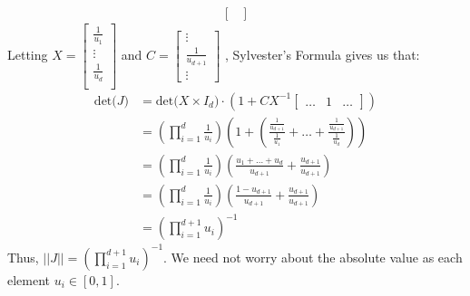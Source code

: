 \documentclass[paper=a4, fontsize=11pt]{scrartcl}
\newcommand{\parens}[1]{ \left( #1 \right) }
\begin{document}
\begin{enumerate}[1.]
\begin{enumerate}[1.]
\begin{align*}
\begin{bmatrix}
              \end{bmatrix}
        \end{align*}
        Letting $X =  \begin{bmatrix}
                        \frac{1}{u_1} \\
                        \vdots \\
                        \frac{1}{u_d} \\
                      \end{bmatrix}$
        and $C =  \begin{bmatrix}
                    \vdots \\
                    \frac{1}{u_{d+1}} \\
                    \vdots
                  \end{bmatrix}$
        , Sylvester's Formula gives us that:
        \begin{align*}
          \mbox{det(} J \mbox{)}
              &=  \mbox{det(} X\times I_d \mbox{)} \cdot (1 + CX^{-1}\begin{bmatrix} \ldots & 1 & \ldots \end{bmatrix}) \\
              &=  \parens{ \prod_{i = 1}^{d}{\frac{1}{u_{i}}} }
                  \parens{ 1 + \parens{ \frac{\frac{1}{u_{d+1}}}{\frac{1}{u_1}} + \ldots + \frac{\frac{1}{u_{d+1}}}{\frac{1}{u_d}} } } \\
              &=  \parens{ \prod_{i = 1}^{d}{\frac{1}{u_{i}}} }
                  \parens{ \frac{u_1 + \ldots + u_d}{u_{d+1}} + \frac{u_{d+1}}{u_{d+1}} } \\
              &=  \parens{ \prod_{i = 1}^{d}{\frac{1}{u_{i}}} }
                  \parens{ \frac{1 - u_{d+1}}{u_{d+1}} + \frac{u_{d+1}}{u_{d+1}}} \\
              &=  \parens{ \prod_{i = 1}^{d+1}{u_{i}} }^{-1}
        \end{align*}
        Thus, $||J|| = \parens{ \prod_{i = 1}^{d+1}{u_{i}} }^{-1}$. We need not worry about the absolute value as each element $u_i \in [0,1]$. \\


\end{enumerate}
\end{enumerate}
\end{document}
